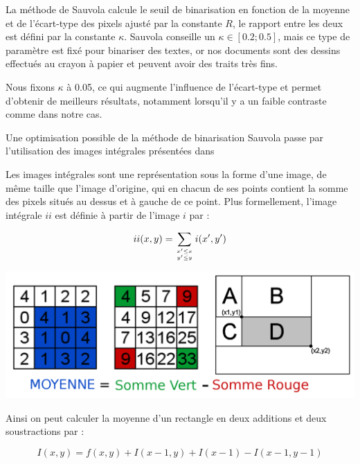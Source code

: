 La méthode de Sauvola calcule le seuil de binarisation en fonction de la moyenne et de l’écart-type des pixels ajusté par la constante $R$, le rapport entre les deux est défini par la constante $\kappa$.
Sauvola conseille un $\kappa \in \left[ 0.2 ;0.5 \right]$, mais ce type de paramètre est fixé pour binariser des textes, or nos documents sont des dessins effectués au crayon à papier et peuvent avoir des traits très fins.

Nous fixons $\kappa$ à 0.05, ce qui augmente l'influence de l’écart-type et permet d'obtenir de meilleurs résultats, notamment lorsqu'il y a un faible contraste comme dans notre cas.   

Une optimisation possible de la méthode de binarisation Sauvola passe par l'utilisation des images intégrales présentées dans \cite{Viola04}

Les images intégrales sont une représentation sous la forme d'une image, de même taille que l'image d'origine, qui en chacun de ses points contient la somme des pixels situés au dessus et à gauche de ce point. Plus formellement, l'image intégrale $ii$ est définie à partir de l'image $i$ par : 

\begin{equation}
	ii(x,y) = \sum_{x' \leq x  \atop y' \leq y } i(x',y')
\end{equation}

\begin{center}
\includegraphics[width=\textwidth]{images/imageIntegrale.png}
\end{center}

Ainsi on peut calculer la moyenne d'un rectangle en deux additions et deux soustractions par :

\begin{equation}
	I(x, y) = f (x, y) + I(x - 1, y) + I(x - 1) - I(x - 1, y - 1)
\end{equation}

